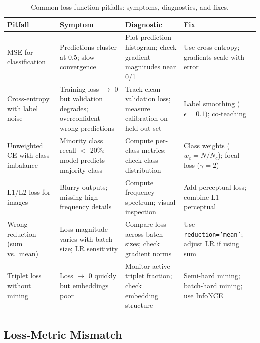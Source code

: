 \documentclass[../../main.tex]{subfiles}
\begin{document}
\begin{table}[htbp]
\centering
\caption{Common loss function pitfalls: symptoms, diagnostics, and fixes.}
\label{tab:loss-pitfalls}
\small
\renewcommand{\arraystretch}{1.3}
\begin{tabularx}{\textwidth}{@{}>{\raggedright\arraybackslash}p{2.5cm}>{\raggedright\arraybackslash}X>{\raggedright\arraybackslash}X>{\raggedright\arraybackslash}X@{}}
\toprule
\textbf{Pitfall} & \textbf{Symptom} & \textbf{Diagnostic} & \textbf{Fix} \\
\midrule
MSE for classification & Predictions cluster at 0.5; slow convergence & Plot prediction histogram; check gradient magnitudes near 0/1 & Use cross-entropy; gradients scale with error \\
\addlinespace
Cross-entropy with label noise & Training loss $\to$ 0 but validation degrades; overconfident wrong predictions & Track clean validation loss; measure calibration on held-out set & Label smoothing ($\epsilon = 0.1$); co-teaching \\
\addlinespace
Unweighted CE with class imbalance & Minority class recall $<$ 20\%; model predicts majority class & Compute per-class metrics; check class distribution & Class weights ($w_c = N/N_c$); focal loss ($\gamma = 2$) \\
\addlinespace
L1/L2 loss for images & Blurry outputs; missing high-frequency details & Compute frequency spectrum; visual inspection & Add perceptual loss; combine L1 + perceptual \\
\addlinespace
Wrong reduction (sum vs.\ mean) & Loss magnitude varies with batch size; LR sensitivity & Compare loss across batch sizes; check gradient norms & Use \texttt{reduction='mean'}; adjust LR if using sum \\
\addlinespace
Triplet loss without mining & Loss $\to$ 0 quickly but embeddings poor & Monitor active triplet fraction; check embedding structure & Semi-hard mining; batch-hard mining; use InfoNCE \\
\bottomrule
\end{tabularx}
\end{table}

\subsection{Loss-Metric Mismatch}
\end{document}

